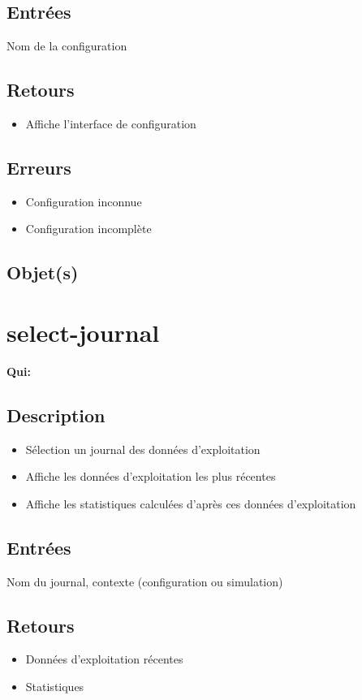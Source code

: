 	\subsection{Entrées}
		Nom de la configuration

	\subsection{Retours}
	\begin{itemize}
		\item Affiche l'interface de configuration
	\end{itemize}

	\subsection{Erreurs}
	\begin{itemize}
		\item Configuration inconnue \fatal
		\item Configuration incomplète \warning
	\end{itemize}

	\subsection{Objet(s)}
		\allobjs

\section{select-journal}
	\textbf{Qui:} \urt

	\subsection{Description}
	\begin{itemize}
		\item Sélection un journal des données d'exploitation
		\item Affiche les données d'exploitation les plus récentes
		\item Affiche les statistiques calculées d'après ces données d'exploitation
	\end{itemize}

	\subsection{Entrées}
		Nom du journal, contexte (configuration ou simulation)

	\subsection{Retours}
	\begin{itemize}
		\item Données d'exploitation récentes
		\item Statistiques
	\end{itemize}

